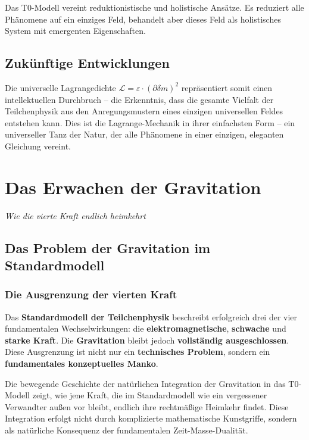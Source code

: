 \documentclass[12pt,a4paper]{report}
\begin{document}
	Das T0-Modell vereint reduktionistische und holistische Ansätze. Es reduziert alle Phänomene auf ein einziges Feld, behandelt aber dieses Feld als holistisches System mit emergenten Eigenschaften.
	
	\section{Zukünftige Entwicklungen}
	
	Die universelle Lagrangedichte $\mathcal{L} = \varepsilon \cdot (\partial\delta m)^2$ repräsentiert somit einen intellektuellen Durchbruch -- die Erkenntnis, dass die gesamte Vielfalt der Teilchenphysik aus den Anregungsmustern eines einzigen universellen Feldes entstehen kann. Dies ist die Lagrange-Mechanik in ihrer einfachsten Form -- ein universeller Tanz der Natur, der alle Phänomene in einer einzigen, eleganten Gleichung vereint.
	\chapter{Das Erwachen der Gravitation}
	\textit{Wie die vierte Kraft endlich heimkehrt}
	
	\section{Das Problem der Gravitation im Standardmodell}
	
	\subsection{Die Ausgrenzung der vierten Kraft}
	
	Das \textbf{Standardmodell der Teilchenphysik} beschreibt erfolgreich drei der vier fundamentalen Wechselwirkungen: die \textbf{elektromagnetische}, \textbf{schwache} und \textbf{starke Kraft}. Die \textbf{Gravitation} bleibt jedoch \textbf{vollständig ausgeschlossen}. Diese Ausgrenzung ist nicht nur ein \textbf{technisches Problem}, sondern ein \textbf{fundamentales konzeptuelles Manko}.
	
	Die bewegende Geschichte der natürlichen Integration der Gravitation in das T0-Modell zeigt, wie jene Kraft, die im Standardmodell wie ein vergessener Verwandter außen vor bleibt, endlich ihre rechtmäßige Heimkehr findet. Diese Integration erfolgt nicht durch komplizierte mathematische Kunstgriffe, sondern als natürliche Konsequenz der fundamentalen Zeit-Masse-Dualität.
	
\end{document}

